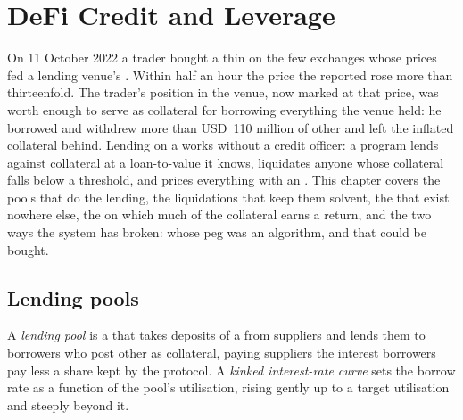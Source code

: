 \chapter{DeFi Credit and Leverage}\label{ch:m3:defi-credit-and-leverage}

On 11 October 2022 a trader bought a thin  on the few exchanges whose prices fed a lending venue's .
Within half an hour the price the  reported rose more than thirteenfold. The trader's position in the
venue, now marked at that price, was worth enough to serve as collateral for borrowing everything the venue
held: he borrowed and withdrew more than USD~110 million of other  and left the inflated collateral
behind. Lending on a  works without a credit officer: a program lends against collateral at a
loan-to-value it knows, liquidates anyone whose collateral falls below a threshold, and prices everything
with an . This chapter covers the pools that do the lending, the liquidations that keep them solvent, the
 that exist nowhere else, the  on which much of the collateral earns a return, and
the two ways the system has broken:  whose peg was an algorithm, and  that could be
bought.

\section{Lending pools}

\begin{definition}\label{def:m3:defi-credit-and-leverage:pool}
A \emph{lending pool} is a  that takes deposits of a  from suppliers and
lends them to borrowers who post other  as collateral, paying suppliers the interest borrowers pay less a
share kept by the protocol. A \emph{kinked interest-rate curve} sets the borrow
rate as a function of the pool's utilisation, rising gently up to a target utilisation and steeply beyond it.
\end{definition}

